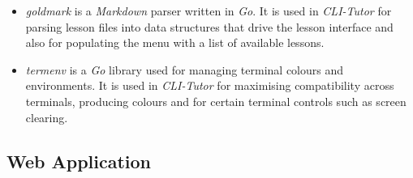 \begin{itemize}
    \item \textit{goldmark} is a \textit{Markdown} parser written in \textit{Go}. It is used in 
        \textit{CLI-Tutor} for parsing lesson files into data structures that
        drive the lesson interface and also for populating the menu with a list
        of available lessons.

    \item \textit{termenv}  is a \textit{Go} library used for managing terminal colours
        and environments. It is used in \textit{CLI-Tutor} for maximising
        compatibility across terminals, producing colours and for certain
        terminal controls such as screen clearing.
\end{itemize}

\subsection{Web Application}

